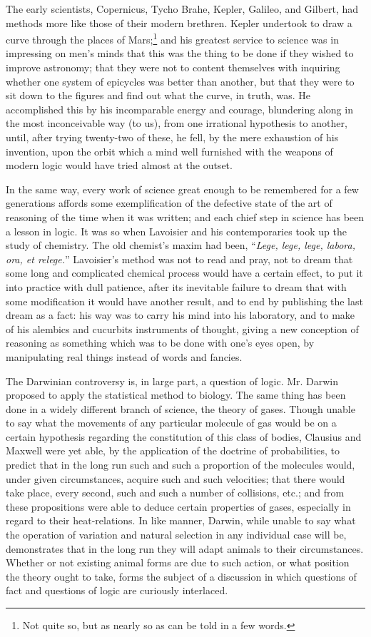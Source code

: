 The early scientists, Copernicus, Tycho Brahe, Kepler, Galileo, and
Gilbert, had methods more like those of their modern brethren. Kepler
undertook to draw a curve through the places of Mars;\footnote{Not
quite so, but as nearly so as can be told in a few words.} and his
greatest service to science was in impressing on men's minds that this
was the thing to be done if they wished to improve astronomy; that
they were not to content themselves with inquiring whether one system
of epicycles was better than another, but that they were to sit down
to the figures and find out what the curve, in truth, was. He
accomplished this by his incomparable energy and courage, blundering
along in the most inconceivable way (to us), from one irrational
hypothesis to another, until, after trying twenty-two of these, he
fell, by the mere exhaustion of his invention, upon the orbit which a
mind well furnished with the weapons of modern logic would have tried
almost at the outset.

In the same way, every work of science great enough to be remembered
for a few generations affords some exemplification of the defective
state of the art of reasoning of the time when it was written; and
each chief step in science has been a lesson in logic. It was so when
Lavoisier and his contemporaries took up the study of chemistry. The
old chemist's maxim had been, ``\textit{Lege, lege, lege, labora, ora,
et relege.}'' Lavoisier's method was not to read and pray, not to
dream that some long and complicated chemical process would have a
certain effect, to put it into practice with dull patience, after its
inevitable failure to dream that with some modification it would have
another result, and to end by publishing the last dream as a fact: his
way was to carry his mind into his laboratory, and to make of his
alembics and cucurbits instruments of thought, giving a new conception
of reasoning as something which was to be done with one's eyes open,
by manipulating real things instead of words and fancies.

The Darwinian controversy is, in large part, a question of logic. Mr.
Darwin proposed to apply the statistical method to biology. The same
thing has been done in a widely different branch of science, the
 theory of gases. Though unable to say what the movements of
any particular molecule of gas would be on a certain hypothesis
regarding the constitution of this class of bodies, Clausius and
Maxwell were yet able, by the application of the doctrine of
probabilities, to predict that in the long run such and such a
proportion of the molecules would, under given circumstances, acquire
such and such velocities; that there would take place, every second,
such and such a number of collisions, etc.; and from these
propositions were able to deduce certain properties of gases,
especially in regard to their heat-relations. In like manner, Darwin,
while unable to say what the operation of variation and natural
selection in any individual case will be, demonstrates that in the
long run they will adapt animals to their circumstances. Whether or
not existing animal forms are due to such action, or what position the
theory ought to take, forms the subject of a discussion in which
questions of fact and questions of logic are curiously interlaced.

